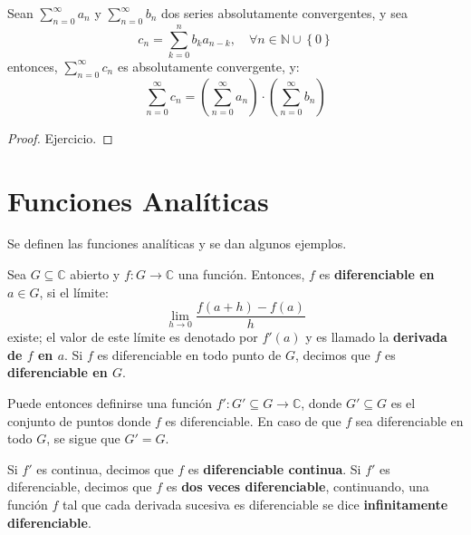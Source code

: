 \documentclass[12pt]{report}
\theoremstyle{largebreak}
\newcommand\cf[3]{\ensuremath{#1:#2\rightarrow#3}}
\begin{document}
    \begin{propo}
        \label{MultSumSeriesPot}
        Sean $\sum_{n=0}^\infty a_n$ y $\sum_{n=0}^\infty b_n$ dos series absolutamente convergentes, y sea
        \begin{equation*}
            c_n=\sum_{ k=0}^n b_ka_{ n-k},\quad\forall n\in\mathbb{N}\cup\left\{0\right\}
        \end{equation*}
        entonces, $\sum_{n=0}^\infty c_n$ es absolutamente convergente, y:
        \begin{equation*}
            \sum_{n=0}^\infty c_n=\left(\sum_{n=0}^\infty a_n\right)\cdot\left(\sum_{n=0}^\infty b_n\right)
        \end{equation*}
    \end{propo}

    \begin{proof}
        Ejercicio.
    \end{proof}

    \section{Funciones Analíticas}

    Se definen las funciones analíticas y se dan algunos ejemplos.

    \begin{mydef}
        Sea $G\subseteq\mathbb{C}$ abierto y $\cf{f}{G}{\mathbb{C}}$ una función. Entonces, $f$ es \textbf{diferenciable en $a\in G$}, si el límite:
        \begin{equation*}
            \lim_{ h\rightarrow0}\frac{f(a+h)-f(a)}{h}
        \end{equation*}
        existe; el valor de este límite es denotado por $f'(a)$ y es llamado la \textbf{derivada de $f$ en $a$}. Si $f$ es diferenciable en todo punto de $G$, decimos que $f$ es \textbf{diferenciable en $G$}.

        Puede entonces definirse una función $\cf{f'}{G'\subseteq G}{\mathbb{C}}$, donde $G'\subseteq G$ es el conjunto de puntos donde $f$ es diferenciable. En caso de que $f$ sea diferenciable en todo $G$, se sigue que $G'=G$.

        Si $f'$ es continua, decimos que $f$ es \textbf{diferenciable continua}. Si $f'$ es diferenciable, decimos que $f$ es \textbf{dos veces diferenciable}, continuando, una función $f$ tal que cada derivada sucesiva es diferenciable se dice \textbf{infinitamente diferenciable}.
    \end{mydef}
\end{document}
